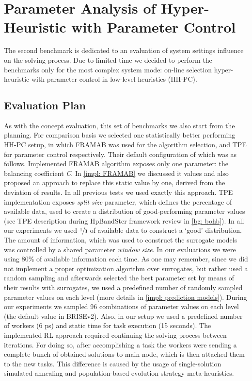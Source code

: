 \section{Parameter Analysis of Hyper-Heuristic with Parameter Control}\label{eval:2}
The second benchmark is dedicated to an evaluation of system settings influence on the solving process.
Due to limited time we decided to perform the benchmarks only for the most complex system mode: on-line selection hyper-heuristic with parameter control in low-level heuristics (HH-PC).

\subsection{Evaluation Plan}\label{eval:2:plan}
As with the concept evaluation, this set of benchmarks we also start from the planning. For comparison basis we selected one statistically better performing HH-PC setup, in which FRAMAB was used for the algorithm selection, and TPE for parameter control respectively. Their default configuration of which was as follows. Implemented FRAMAB algorithm exposes only one parameter: the balancing coefficient \emph{C}. In \cref{impl: FRAMAB} we discussed it values and also proposed an approach to replace this static value by one, derived from the deviation of results. In all previous tests we used exactly this approach. TPE implementation exposes \emph{split size} parameter, which defines the percentage of available data, used to create a distribution of good-performing parameter values (see TPE description during HpBandSter framework review in \cref{bg: bohb}). In all our experiments we used $\sfrac{1}{3}$ of available data to construct a `good' distribution. The amount of information, which was used to construct the surrogate models was controlled by a shared parameter \emph{window size}. In our evaluations we were using 80\% of available information each time. As one may remember, since we did not implement a proper optimization algorithm over surrogates, but rather used a random sampling and afterwards selected the best parameter set by means of their results with surrogates, we used a predefined number of randomly sampled parameter values on each level (more details in \cref{impl: prediction models}). During our experiments we sampled 96 combinations of parameter values on each level (the default value in BRISEv2). Also, in our setup we used a predefined number of workers (6 ps) and static time for task execution (15 seconds). The implemented RL approach required continuing the solving process between iterations. For doing so, after accomplishing a task the workers were sending a complete bunch of obtained solutions to main node, which is then attached them to the new tasks. This difference is caused by the usage of single-solution simulated annealing and population-based evolution strategy meta-heuristics.

